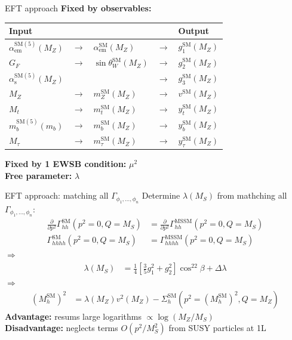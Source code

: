 \documentclass[hyperref={pdfpagelabels=false},ngerman]{beamer}
\renewcommand{\emph}{\textbf}
\newcommand{\SM}{\ensuremath{\text{SM}}}
\begin{document}
\begin{frame}{EFT approach}
  \emph{Fixed by observables:}
  \begin{table}
    \centering
    \begin{tabular}{lllll}
      Input & & & & Output \\
      \midrule
      $\alpha_\text{em}^{\SM(5)}(M_Z)$ & $\rightarrow$ & $\alpha_\text{em}^\SM(M_Z)$ & $\rightarrow$ & $g_1^\SM(M_Z)$ \\
      $G_F$ & $\rightarrow$ & $\sin\theta_W^\SM(M_Z)$ & $\rightarrow$ & $g_2^\SM(M_Z)$ \\
      $\alpha_\text{s}^{\SM(5)}(M_Z)$ & & & $\rightarrow$ & $g_3^\SM(M_Z)$ \\
      $M_Z$ & $\rightarrow$ & $m_Z^\SM(M_Z)$ & $\rightarrow$ & $v^\SM(M_Z)$ \\
      $M_t$ & $\rightarrow$ & $m_t^\SM(M_Z)$ & $\rightarrow$ & $y_t^\SM(M_Z)$ \\
      $m_b^{\SM(5)}(m_b)$ & $\rightarrow$ & $m_b^\SM(M_Z)$ & $\rightarrow$ & $y_b^\SM(M_Z)$ \\
      $M_\tau$ & $\rightarrow$ & $m_\tau^\SM(M_Z)$ & $\rightarrow$ & $y_\tau^\SM(M_Z)$ \\
    \end{tabular}
  \end{table}
  \emph{Fixed by 1 EWSB condition:} $\mu^2$ \\[1em]
  \emph{Free parameter:} $\lambda$
\end{frame}

\begin{frame}{EFT approach: matching all $\Gamma_{\phi_1,\ldots,\phi_n}$}
  Determine $\lambda(M_S)$ from mathching all $\Gamma_{\phi_1,\ldots,\phi_n}$:
  \begin{align*}
    \frac{\partial}{\partial p^2}\Gamma_{hh}^{\SM}(p^2 = 0, Q = M_S) &= \frac{\partial}{\partial p^2}\Gamma_{hh}^\text{MSSM}(p^2 = 0, Q = M_S) \\
    \Gamma_{hhhh}^{\SM}(p^2 = 0, Q = M_S) &= \Gamma_{hhhh}^\text{MSSM}(p^2 = 0, Q = M_S)
  \end{align*}
  $\Rightarrow$
  \begin{align*}
    \lambda (M_S) &= \frac{1}{4}\left[\frac{3}{5} g_1^{2} + g_2^2\right] \cos^22\beta
    + \Delta \lambda
  \end{align*}
  $\Rightarrow$
  \begin{align*}
    (M_h^\SM)^2 &= \lambda(M_Z) v^2(M_Z) - \Sigma^\SM_h(p^2 = (M_h^\SM)^2,Q =
    M_Z)
  \end{align*}
  \emph{Advantage:} resums large logarithms $\propto\log(M_Z/M_S)$\\
  \emph{Disadvantage:} neglects terms $O(p^2/M_S^2)$ from SUSY particles at 1L
\end{frame}
\end{document}
